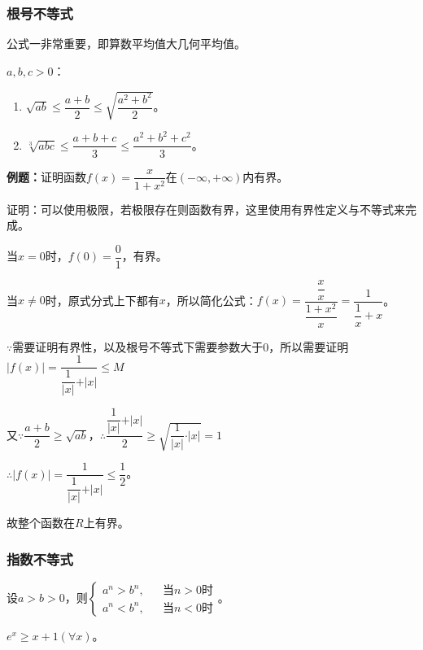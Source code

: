 \documentclass[UTF8, 12pt]{ctexart}
\begin{document}
        \subsubsection{根号不等式}

        公式一非常重要，即算数平均值大几何平均值。

        $a,b,c>0$：

        \begin{enumerate}
            \item $\sqrt{ab}\leqslant\dfrac{a+b}{2}\leqslant\sqrt{\dfrac{a^2+b^2}{2}}$。
            \item $\sqrt[3]{abc}\leqslant\dfrac{a+b+c}{3}\leqslant\dfrac{a^2+b^2+c^2}{3}$。
        \end{enumerate}

        \textbf{例题：}证明函数$f(x)=\dfrac{x}{1+x^2}$在$(-\infty,+\infty)$内有界。

        证明：可以使用极限，若极限存在则函数有界，这里使用有界性定义与不等式来完成。

        当$x=0$时，$f(0)=\dfrac{0}{1}$，有界。

        当$x\neq 0$时，原式分式上下都有$x$，所以简化公式：$f(x)=\dfrac{\dfrac{x}{x}}{\dfrac{1+x^2}{x}}=\dfrac{1}{\dfrac{1}{x}+x}$。

        $\because$需要证明有界性，以及根号不等式下需要参数大于0，所以需要证明$\vert f(x)\vert=\dfrac{1}{\dfrac{1}{\vert x\vert}+\vert x\vert}\leqslant M$

        又$\because\dfrac{a+b}{2}\geqslant\sqrt{ab}$，$\therefore \dfrac{\dfrac{1}{\vert x\vert}+\vert x\vert}{2}\geqslant\sqrt{\dfrac{1}{\vert x\vert}\cdot\vert x\vert}=1$

        $\therefore\vert f(x)\vert=\dfrac{1}{\dfrac{1}{\vert x\vert}+\vert x\vert}\leqslant\dfrac{1}{2}$。

        故整个函数在$R$上有界。

        \subsubsection{指数不等式}

        设$a>b>0$，则$
        \left\{
        \begin{array}{lcl}
            a^n>b^n,   &  & \text{当}n>0\text{时} \\
            a^n<b^n, &  & \text{当}n<0\text{时}
        \end{array}
        \right.$。

        $e^x\geqslant x+1(\forall x)$。
\end{document}
